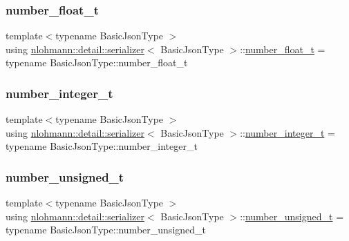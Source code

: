 \subsubsection{\texorpdfstring{number\+\_\+float\+\_\+t}{number\_float\_t}}
{\footnotesize\ttfamily template$<$typename Basic\+Json\+Type $>$ \\
using \hyperlink{classnlohmann_1_1detail_1_1serializer}{nlohmann\+::detail\+::serializer}$<$ Basic\+Json\+Type $>$\+::\hyperlink{classnlohmann_1_1detail_1_1serializer_a460c6794fbabbb2ae83380e987a6c030}{number\+\_\+float\+\_\+t} =  typename Basic\+Json\+Type\+::number\+\_\+float\+\_\+t\hspace{0.3cm}{\ttfamily [private]}}

\mbox{\label{classnlohmann_1_1detail_1_1serializer_ae7b1df1c70bdec1371f297567726a198}} 
\subsubsection{\texorpdfstring{number\+\_\+integer\+\_\+t}{number\_integer\_t}}
{\footnotesize\ttfamily template$<$typename Basic\+Json\+Type $>$ \\
using \hyperlink{classnlohmann_1_1detail_1_1serializer}{nlohmann\+::detail\+::serializer}$<$ Basic\+Json\+Type $>$\+::\hyperlink{classnlohmann_1_1detail_1_1serializer_ae7b1df1c70bdec1371f297567726a198}{number\+\_\+integer\+\_\+t} =  typename Basic\+Json\+Type\+::number\+\_\+integer\+\_\+t\hspace{0.3cm}{\ttfamily [private]}}

\mbox{\label{classnlohmann_1_1detail_1_1serializer_a16c7b7a726a38ff0c06dce7ba7968391}} 
\subsubsection{\texorpdfstring{number\+\_\+unsigned\+\_\+t}{number\_unsigned\_t}}
{\footnotesize\ttfamily template$<$typename Basic\+Json\+Type $>$ \\
using \hyperlink{classnlohmann_1_1detail_1_1serializer}{nlohmann\+::detail\+::serializer}$<$ Basic\+Json\+Type $>$\+::\hyperlink{classnlohmann_1_1detail_1_1serializer_a16c7b7a726a38ff0c06dce7ba7968391}{number\+\_\+unsigned\+\_\+t} =  typename Basic\+Json\+Type\+::number\+\_\+unsigned\+\_\+t\hspace{0.3cm}{\ttfamily [private]}}

